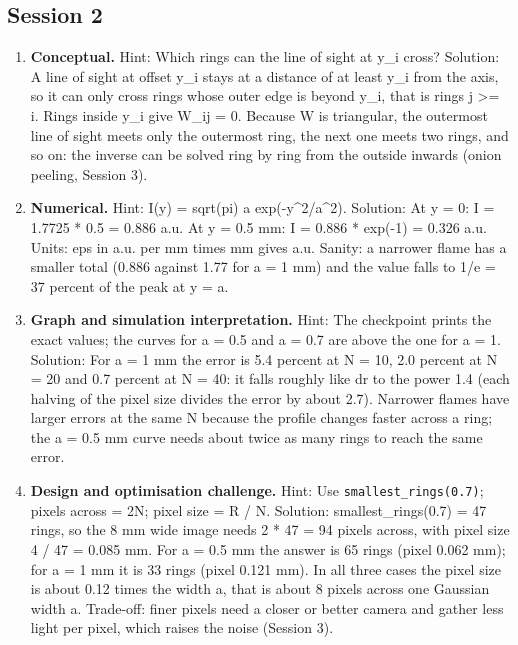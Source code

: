 \documentclass[11pt,a4paper]{article}
\begin{document}
\subsection*{Session 2}
\begin{enumerate}[nosep]
\item \textbf{Conceptual.} Hint: Which rings can the line of sight at y\_i cross? Solution: A line of sight at offset y\_i stays at a distance of at least y\_i from the axis, so it can only cross rings whose outer edge is beyond y\_i, that is rings j \textgreater{}= i. Rings inside y\_i give W\_ij = 0. Because W is triangular, the outermost line of sight meets only the outermost ring, the next one meets two rings, and so on: the inverse can be solved ring by ring from the outside inwards (onion peeling, Session 3).
\item \textbf{Numerical.} Hint: I(y) = sqrt(pi) a exp(-y\textasciicircum{}2/a\textasciicircum{}2). Solution: At y = 0: I = 1.7725 * 0.5 = 0.886 a.u. At y = 0.5 mm: I = 0.886 * exp(-1) = 0.326 a.u. Units: eps in a.u. per mm times mm gives a.u. Sanity: a narrower flame has a smaller total (0.886 against 1.77 for a = 1 mm) and the value falls to 1/e = 37 percent of the peak at y = a.
\item \textbf{Graph and simulation interpretation.} Hint: The checkpoint prints the exact values; the curves for a = 0.5 and a = 0.7 are above the one for a = 1. Solution: For a = 1 mm the error is 5.4 percent at N = 10, 2.0 percent at N = 20 and 0.7 percent at N = 40: it falls roughly like dr to the power 1.4 (each halving of the pixel size divides the error by about 2.7). Narrower flames have larger errors at the same N because the profile changes faster across a ring; the a = 0.5 mm curve needs about twice as many rings to reach the same error.
\item \textbf{Design and optimisation challenge.} Hint: Use \texttt{smallest\_rings(0.7)}; pixels across = 2N; pixel size = R / N. Solution: smallest\_rings(0.7) = 47 rings, so the 8 mm wide image needs 2 * 47 = 94 pixels across, with pixel size 4 / 47 = 0.085 mm. For a = 0.5 mm the answer is 65 rings (pixel 0.062 mm); for a = 1 mm it is 33 rings (pixel 0.121 mm). In all three cases the pixel size is about 0.12 times the width a, that is about 8 pixels across one Gaussian width a. Trade-off: finer pixels need a closer or better camera and gather less light per pixel, which raises the noise (Session 3).
\end{enumerate}
\end{document}
